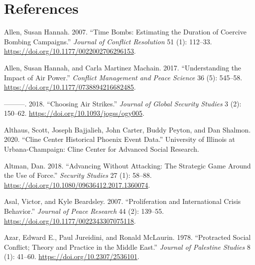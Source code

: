\documentclass[
]{article}
\newlength{\cslhangindent}
\newlength{\cslentryspacingunit} %
\newenvironment{CSLReferences}[2] %
 {%
  \setlength{\parindent}{0pt}
  \ifodd #1
  \let\oldpar\par
  \def\par{\hangindent=\cslhangindent\oldpar}
  \fi
  \setlength{\parskip}{#2\cslentryspacingunit}
 }%
 {}
\begin{document}
\newpage

\hypertarget{references}{%
\section*{References}\label{references}}

\hypertarget{refs}{}
\begin{CSLReferences}{1}{0}
\leavevmode{}%
Allen, Susan Hannah. 2007. {``Time {Bombs}: {Estimating} the {Duration} of {Coercive Bombing Campaigns}.''} \emph{Journal of Conflict Resolution} 51 (1): 112--33. \url{https://doi.org/10.1177/0022002706296153}.

\leavevmode{}%
Allen, Susan Hannah, and Carla Martinez Machain. 2017. {``Understanding the Impact of Air Power.''} \emph{Conflict Management and Peace Science} 36 (5): 545--58. \url{https://doi.org/10.1177/0738894216682485}.

\leavevmode{}%
---------. 2018. {``Choosing {Air Strikes}.''} \emph{Journal of Global Security Studies} 3 (2): 150--62. \url{https://doi.org/10.1093/jogss/ogy005}.

\leavevmode{}%
Althaus, Scott, Joseph Bajjalieh, John Carter, Buddy Peyton, and Dan Shalmon. 2020. {``Cline {Center Historical Phoenix Event Data}.''} {University of Illinois at Urbana-Champaign}: {Cline Center for Advanced Social Research}.

\leavevmode{}%
Altman, Dan. 2018. {``Advancing Without {Attacking}: {The Strategic Game} Around the {Use} of {Force}.''} \emph{Security Studies} 27 (1): 58--88. \url{https://doi.org/10.1080/09636412.2017.1360074}.

\leavevmode{}%
Asal, Victor, and Kyle Beardsley. 2007. {``Proliferation and {International Crisis Behavior}.''} \emph{Journal of Peace Research} 44 (2): 139--55. \url{https://doi.org/10.1177/0022343307075118}.

\leavevmode{}%
Azar, Edward E., Paul Jureidini, and Ronald McLaurin. 1978. {``Protracted {Social Conflict}; {Theory} and {Practice} in the {Middle East}.''} \emph{Journal of Palestine Studies} 8 (1): 41--60. \url{https://doi.org/10.2307/2536101}.


\end{CSLReferences}
\end{document}
